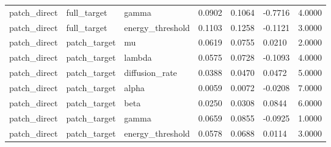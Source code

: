 \begin{table}[t]
\begin{tabular}{lllllll}
patch\_direct & full\_target & gamma & 0.0902 & 0.1064 & -0.7716 & 4.0000 \\
patch\_direct & full\_target & energy\_threshold & 0.1103 & 0.1258 & -0.1121 & 3.0000 \\
patch\_direct & patch\_target & mu & 0.0619 & 0.0755 & 0.0210 & 2.0000 \\
patch\_direct & patch\_target & lambda & 0.0575 & 0.0728 & -0.1093 & 4.0000 \\
patch\_direct & patch\_target & diffusion\_rate & 0.0388 & 0.0470 & 0.0472 & 5.0000 \\
patch\_direct & patch\_target & alpha & 0.0059 & 0.0072 & -0.0208 & 7.0000 \\
patch\_direct & patch\_target & beta & 0.0250 & 0.0308 & 0.0844 & 6.0000 \\
patch\_direct & patch\_target & gamma & 0.0659 & 0.0855 & -0.0925 & 1.0000 \\
patch\_direct & patch\_target & energy\_threshold & 0.0578 & 0.0688 & 0.0114 & 3.0000 \\
\bottomrule
\end{tabular}
\end{table}
